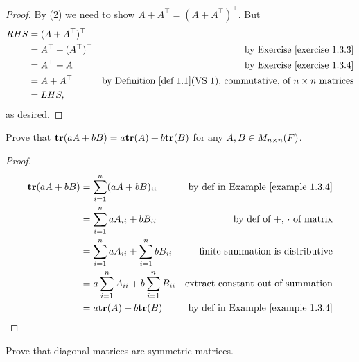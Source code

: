 \begin{proof}
By (2) we need to show \(A + A^\top = (A + A^\top)^\top\).
But
\begin{align*}
    RHS & = (A + A^\top)^\top \\
        & = A^\top + (A^\top)^\top & \text{by \EXEC{1.3.3}} \\
        & = A^\top + A & \text{by \EXEC{1.3.4}} \\
        & = A + A^\top & \text{by \DEF{1.1}(VS 1), commutative, of \(n \X n\) matrices} \\
        & = LHS,
\end{align*}
as desired.
\end{proof}

\begin{exercise} \label{exercise 1.3.6}
Prove that \(\textbf{tr}(aA + bB) = a \textbf{tr}(A) + b \textbf{tr}(B)\) for any \(A, B \in M_{n \times n}(F)\).
\end{exercise}

\begin{proof}
\begin{align*}
    \TRACE(aA + bB) & = \sum_{i = 1}^{n} (aA + bB)_{ii} & \text{by def in \EXAMPLE{1.3.4}} \\
                    & = \sum_{i = 1}^{n} aA_{ii} + bB_{ii} & \text{by def of \(+\), \(\cdot\) of matrix} \\
                    & = \sum_{i = 1}^{n} aA_{ii} + \sum_{i = 1}^{n} bB_{ii} & \text{finite summation is distributive} \\
                    & = a \sum_{i = 1}^{n} A_{ii} + b \sum_{i = 1}^{n} B_{ii} & \text{extract constant out of summation} \\
                    & = a \TRACE(A) + b \TRACE(B) & \text{by def in \EXAMPLE{1.3.4}}
\end{align*}
\end{proof}

\begin{exercise} \label{exercise 1.3.7}
Prove that diagonal matrices are symmetric matrices.
\end{exercise}


